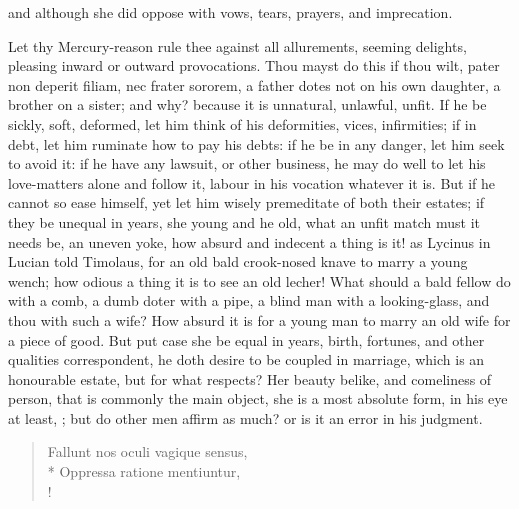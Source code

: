 and although she did oppose with vows, tears, prayers, and imprecation.

Let thy Mercury-reason rule thee against all allurements, seeming
delights, pleasing inward or outward provocations. Thou mayst do this
if thou wilt, pater non deperit filiam, nec frater sororem, a father
dotes not on his own daughter, a brother on a sister; and why? because
it is unnatural, unlawful, unfit. If he be sickly, soft, deformed, let
him think of his deformities, vices, infirmities; if in debt, let him
ruminate how to pay his debts: if he be in any danger, let him seek to
avoid it: if he have any lawsuit, or other business, he may do well to
let his love-matters alone and follow it, labour in his vocation
whatever it is. But if he cannot so ease himself, yet let him wisely
premeditate of both their estates; if they be unequal in years, she
young and he old, what an unfit match must it needs be, an uneven yoke,
how absurd and indecent a thing is it! as Lycinus in Lucian told
Timolaus, for an old bald crook-nosed knave to marry a young wench; how
odious a thing it is to see an old lecher! What should a bald fellow do
with a comb, a dumb doter with a pipe, a blind man with a
looking-glass, and thou with such a wife? How absurd it is for a young
man to marry an old wife for a piece of good. But put case she be equal
in years, birth, fortunes, and other qualities correspondent, he doth
desire to be coupled in marriage, which is an honourable estate, but
for what respects? Her beauty belike, and comeliness of person, that is
commonly the main object, she is a most absolute form, in his eye at
least, ; but do other
men affirm as much? or is it an error in his judgment.
%
\begin{latin}%
\begin{verse}%
Fallunt nos oculi vagique sensus,\\*
Oppressa ratione mentiuntur,\\!
\end{verse}%
\end{latin}%
%

